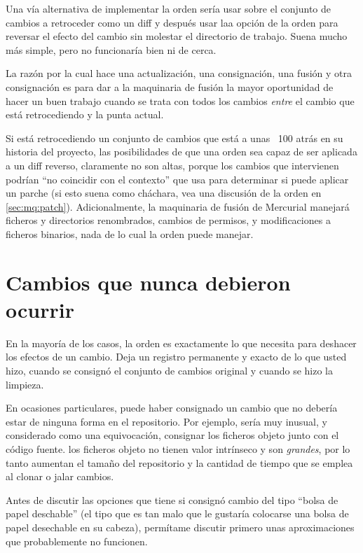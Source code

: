 Una vía alternativa de implementar la orden  sería usar
 sobre el conjunto de cambios a retroceder como un diff
y después usar laa opción  de la orden
 para reversar el efecto del cambio sin molestar el
directorio de trabajo.  Suena mucho más simple, pero no funcionaría
bien ni de cerca.

La razón por la cual  hace una actualización, una
consignación, una fusión y otra consignación es para dar a la
maquinaria de fusión la mayor oportunidad de hacer un buen trabajo
cuando se trata con todos los cambios \emph{entre} el cambio que está
retrocediendo y la punta actual.

Si está retrocediendo un conjunto de cambios que está a unas ~100
atrás en su historia del proyecto, las posibilidades de que una orden
 sea capaz de ser aplicada a un diff reverso,
claramente no son altas, porque los cambios que intervienen podrían
``no coincidir con el contexto'' que  usa  para
determinar si puede aplicar un parche (si esto suena como cháchara,
vea una discusión de la orden  en \ref{sec:mq:patch}).
Adicionalmente, la maquinaria de fusión de Mercurial manejará ficheros
y directorios renombrados, cambios de permisos, y modificaciones a
ficheros binarios, nada de lo cual la orden  puede manejar.

\section{Cambios que nunca debieron ocurrir}
\label{sec:undo:aaaiiieee}

En la mayoría de los casos, la orden  es exactamente lo
que necesita para deshacer los efectos de un cambio.  Deja un registro
permanente y exacto de lo que usted hizo, cuando se consignó el
conjunto de cambios original y cuando se hizo la limpieza.

En ocasiones particulares, puede haber consignado un cambio que no
debería estar de ninguna forma en el repositorio.  Por ejemplo, sería
muy inusual, y considerado como una equivocación, consignar los
ficheros objeto junto con el código fuente. los ficheros objeto no
tienen valor intrínseco y son \emph{grandes}, por lo tanto aumentan el
tamaño del repositorio y la cantidad de tiempo que se emplea al clonar
o jalar cambios.

Antes de discutir las opciones que tiene si consignó cambio del tipo 
``bolsa de papel deschable'' (el tipo que es tan malo que le gustaría
colocarse una bolsa de papel desechable en su cabeza), permítame
discutir primero unas aproximaciones que probablemente no funcionen.

